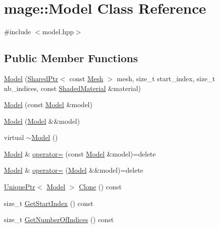 \hypertarget{classmage_1_1_model}{}\section{mage\+:\+:Model Class Reference}
\label{classmage_1_1_model}


{\ttfamily \#include $<$model.\+hpp$>$}

\subsection*{Public Member Functions}
\begin{DoxyCompactItemize}
\item 
\hyperlink{classmage_1_1_model_aca2d5faa95a447ff3ecaab685aec8581}{Model} (\hyperlink{namespacemage_a1e01ae66713838a7a67d30e44c67703e}{Shared\+Ptr}$<$ const \hyperlink{classmage_1_1_mesh}{Mesh} $>$ mesh, size\+\_\+t start\+\_\+index, size\+\_\+t nb\+\_\+indices, const \hyperlink{structmage_1_1_shaded_material}{Shaded\+Material} \&material)
\item 
\hyperlink{classmage_1_1_model_ac5f1d340bbfefd30bec3e6343a86059a}{Model} (const \hyperlink{classmage_1_1_model}{Model} \&model)
\item 
\hyperlink{classmage_1_1_model_a71abc57cde3bd6270de88bfa3aa47601}{Model} (\hyperlink{classmage_1_1_model}{Model} \&\&model)
\item 
virtual \hyperlink{classmage_1_1_model_af9f45ed2dcf470f85bbfd144ca9857a7}{$\sim$\+Model} ()
\item 
\hyperlink{classmage_1_1_model}{Model} \& \hyperlink{classmage_1_1_model_a563515c64ec39cfcda9f6ca37576391b}{operator=} (const \hyperlink{classmage_1_1_model}{Model} \&model)=delete
\item 
\hyperlink{classmage_1_1_model}{Model} \& \hyperlink{classmage_1_1_model_a084e30d15822bfefa79128f30a57cc02}{operator=} (\hyperlink{classmage_1_1_model}{Model} \&\&model)=delete
\item 
\hyperlink{namespacemage_a8c307fbcc33bce9b7f2aa4c26c3b95cf}{Unique\+Ptr}$<$ \hyperlink{classmage_1_1_model}{Model} $>$ \hyperlink{classmage_1_1_model_a39d5f0b2b83729a68569072d69113ed7}{Clone} () const
\item 
size\+\_\+t \hyperlink{classmage_1_1_model_af17401dfd3e51f96dc0652a3aa3c4412}{Get\+Start\+Index} () const
\item 
size\+\_\+t \hyperlink{classmage_1_1_model_ac118db61c4541d16d9b1b52e55524956}{Get\+Number\+Of\+Indices} () const
\item 

\end{DoxyCompactItemize}
